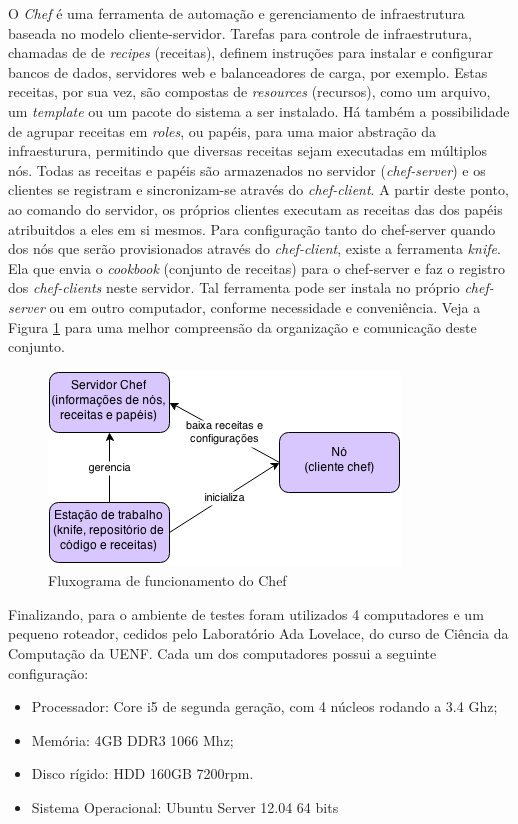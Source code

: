 O \emph{Chef} é uma ferramenta de automação e gerenciamento de infraestrutura
baseada no modelo cliente-servidor. Tarefas para controle de infraestrutura,
chamadas de de \emph{recipes} (receitas), definem instruções
para instalar e configurar bancos de dados, servidores web e balanceadores de
carga, por exemplo. Estas receitas, por sua vez, são compostas de \emph{resources}
(recursos), como um arquivo, um \emph{template} ou um pacote do sistema a ser instalado.
Há também a possibilidade de agrupar receitas em \emph{roles}, ou papéis, para
uma maior abstração da infraesturura, permitindo que diversas receitas sejam
executadas em múltiplos nós. Todas as receitas e papéis são armazenados no servidor
(\emph{chef-server}) e os clientes se registram e sincronizam-se através do
\emph{chef-client}. A partir deste ponto, ao comando do servidor, os próprios
clientes executam as receitas das dos papéis atribuitdos a eles em si mesmos. Para
configuração tanto do chef-server quando dos nós que serão provisionados através
do \emph{chef-client}, existe a ferramenta \emph{knife}. Ela que envia o \emph{cookbook}
(conjunto de receitas) para o chef-server e faz o registro dos \emph{chef-clients}
neste servidor. Tal ferramenta pode ser instala no próprio \emph{chef-server} ou em
outro computador, conforme necessidade e conveniência. Veja a Figura \ref{img:chef}
para uma melhor compreensão da organização e comunicação deste conjunto.

\begin{figure}[h]
  \center
  \includegraphics[scale=1.0]{imagem/chef.png}
  \caption{Fluxograma de funcionamento do Chef}
  \label{img:chef}
\end{figure}

Finalizando, para o ambiente de testes foram utilizados 4 computadores
e um pequeno roteador, cedidos pelo Laboratório Ada Lovelace, do curso de
Ciência da Computação da UENF. Cada um dos computadores possui a seguinte configuração:

\begin{itemize}
    \item Processador: Core i5 de segunda geração, com 4 núcleos rodando a 3.4 Ghz;
    \item Memória: 4GB DDR3 1066 Mhz;
    \item Disco rígido: HDD 160GB 7200rpm.
    \item Sistema Operacional: Ubuntu Server 12.04 64 bits
\end{itemize}

